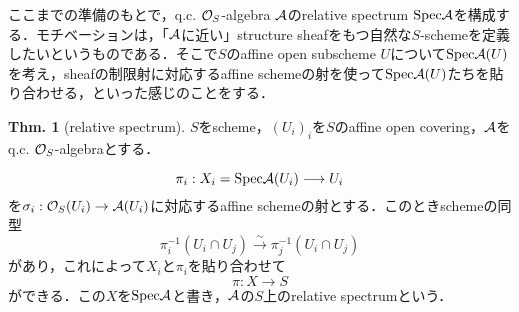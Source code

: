 \documentclass[dvipdfmx,b5paper,papersize]{jsarticle}
\theoremstyle{definition}
\newtheorem{thm}{Thm.}
\begin{document}
ここまでの準備のもとで，q.c. ${\cal{O}}_S$-algebra $\cal{A}$のrelative spectrum ${\rm Spec}{\cal{A}}$を構成する．モチベーションは，「${\cal{A}}$に近い」structure sheafをもつ自然な$S$-schemeを定義したいというものである．そこで$S$のaffine open subscheme $U$について${\rm Spec}{\cal{A}}(U)$を考え，sheafの制限射に対応するaffine schemeの射を使って${\rm Spec}{\cal{A}}(U)$たちを貼り合わせる，といった感じのことをする．
\begin{thm}[relative spectrum]\label{thm:glueing}
  $S$をscheme，$(U_i)_i$を$S$のaffine open covering，$\cal{A}$をq.c. ${\cal{O}}_S$-algebraとする．

  \[
    \pi_i:X_i={\rm Spec}{\cal{A}}(U_i) \longrightarrow U_i
  \]
  を$\sigma_i:{\cal{O}}_{S}(U_i) \to {\cal{A}}(U_i)$に対応するaffine schemeの射とする．このときschemeの同型
  \[
    \pi_{i}^{-1}(U_i\cap U_j) \xrightarrow{\sim} \pi_{j}^{-1}(U_i\cap U_j)
  \]
  があり，これによって$X_i$と$\pi_i$を貼り合わせて
  \[
    \pi:X \longrightarrow S
  \]
  ができる．この$X$を${\rm Spec}{\cal{A}}$と書き，$\cal{A}$の$S$上のrelative spectrumという．
\end{thm}
\end{document}
